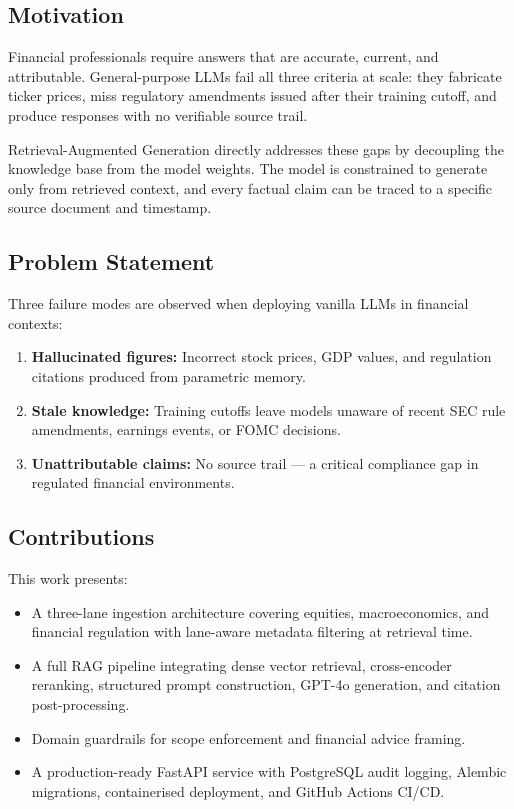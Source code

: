 \documentclass[10pt,a4paper,twocolumn]{article}
\begin{document}
\subsection{Motivation}

Financial professionals require answers that are accurate, current, and attributable. General-purpose
LLMs fail all three criteria at scale: they fabricate ticker prices, miss regulatory amendments
issued after their training cutoff, and produce responses with no verifiable source trail.

Retrieval-Augmented Generation \cite{lewis2020rag} directly addresses these gaps by decoupling
the knowledge base from the model weights. The model is constrained to generate only from
retrieved context, and every factual claim can be traced to a specific source document and timestamp.

\subsection{Problem Statement}

Three failure modes are observed when deploying vanilla LLMs in financial contexts:

\begin{enumerate}[label=\arabic*.]
  \item \textbf{Hallucinated figures:} Incorrect stock prices, GDP values, and regulation
        citations produced from parametric memory.
  \item \textbf{Stale knowledge:} Training cutoffs leave models unaware of recent SEC rule
        amendments, earnings events, or FOMC decisions.
  \item \textbf{Unattributable claims:} No source trail --- a critical compliance gap in
        regulated financial environments.
\end{enumerate}

\subsection{Contributions}

This work presents:
\begin{itemize}
  \item A three-lane ingestion architecture covering equities, macroeconomics, and financial
        regulation with lane-aware metadata filtering at retrieval time.
  \item A full RAG pipeline integrating dense vector retrieval, cross-encoder reranking,
        structured prompt construction, GPT-4o generation, and citation post-processing.
  \item Domain guardrails for scope enforcement and financial advice framing.
  \item A production-ready FastAPI service with PostgreSQL audit logging, Alembic
        migrations, containerised deployment, and GitHub Actions CI/CD.
\end{itemize}
\end{document}

